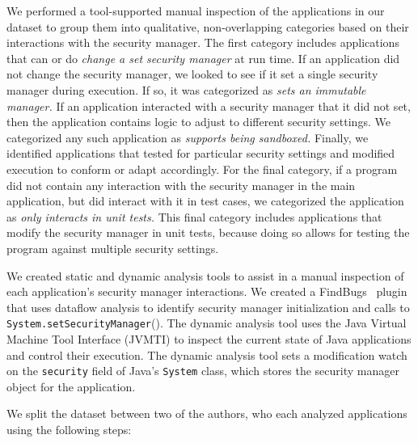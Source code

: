 \documentclass{sig-alternate}
\begin{document}
We performed a tool-supported manual inspection of the applications in our
dataset to group them
into qualitative, non-overlapping categories based on their interactions with the security 
manager. The first category includes applications that can or do
\emph{change a set security manager} at run time.
If an application did not change the security manager, 
we looked to see if it set a single security manager 
during execution.  If so, it
was categorized as \emph{sets an immutable manager.}  If an
application interacted with a security manager that it did not set, 
then the application contains logic to adjust to different security settings.
We categorized any such application
as \emph{supports being sandboxed.}  Finally, we identified
applications that tested for particular security settings and modified execution
to conform or adapt accordingly.
For the final category, if a
program did not contain any interaction with the security manager in 
the main application, but did interact with it
in test cases, we categorized the
application as \emph{only interacts in unit tests.}  This final category
includes applications that modify the security manager in unit tests, because doing
so allows for testing the program against multiple security settings.

We created static and dynamic analysis tools
to assist in a manual inspection of each application's security manager
interactions. We created a 
FindBugs~\cite{hovemeyer_finding_2004} plugin that
uses dataflow analysis to identify security manager initialization and calls to \texttt{System.setSecurityManager}().
The dynamic analysis tool uses the Java Virtual Machine
Tool Interface (JVMTI) \cite{_jvmti}
to inspect the current state of Java applications and control
their execution. The dynamic analysis tool sets a modification watch
on the \texttt{security} field of Java's \texttt{System} class, which
stores the security manager object for the application.

We split the dataset between two of the authors, who each analyzed
applications using the following steps:
\end{document}
